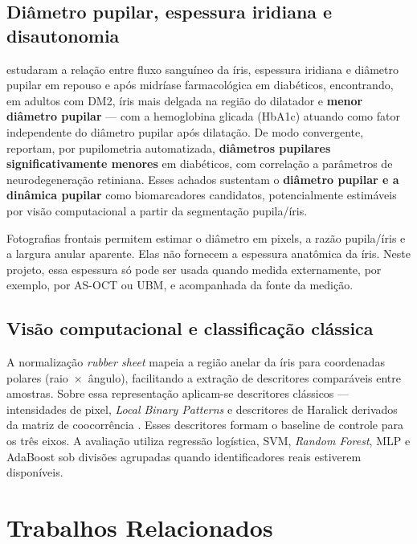 \documentclass[12pt,a4paper]{article}
\begin{document}
\subsection{Diâmetro pupilar, espessura iridiana e disautonomia}
\citet{Cui2024BMC} estudaram a relação entre fluxo sanguíneo da íris, espessura iridiana e diâmetro
pupilar em repouso e após midríase farmacológica em diabéticos, encontrando, em adultos com DM2,
íris mais delgada na região do dilatador e \textbf{menor diâmetro pupilar} --- com a hemoglobina
glicada (HbA1c) atuando como fator independente do diâmetro pupilar após dilatação. De modo
convergente, \citet{Thakar2025Eye} reportam, por pupilometria automatizada, \textbf{diâmetros
pupilares significativamente menores} em diabéticos, com correlação a parâmetros de neurodegeneração
retiniana. Esses achados sustentam o \textbf{diâmetro pupilar e a dinâmica pupilar} como biomarcadores
candidatos, potencialmente estimáveis por visão computacional a partir da segmentação pupila/íris.

Fotografias frontais permitem estimar o diâmetro em pixels, a razão pupila/íris e a largura anular
aparente. Elas não fornecem a espessura anatômica da íris. Neste projeto, essa espessura só pode ser
usada quando medida externamente, por exemplo, por AS-OCT ou UBM, e acompanhada da fonte da medição.

\subsection{Visão computacional e classificação clássica}
A normalização \emph{rubber sheet} \citep{Daugman2004} mapeia a região anelar da íris para coordenadas
polares (raio~$\times$~ângulo), facilitando a extração de descritores comparáveis entre amostras.
Sobre essa representação aplicam-se descritores clássicos --- intensidades de pixel, \emph{Local Binary
Patterns} \citep{Ojala2002LBP} e descritores de Haralick derivados da matriz de coocorrência
\citep{Haralick1973Texture}. Esses descritores formam o baseline de controle para os três eixos. A
avaliação utiliza regressão logística, SVM, \emph{Random Forest}, MLP e AdaBoost sob divisões agrupadas
quando identificadores reais estiverem disponíveis.

\section{Trabalhos Relacionados}
\end{document}
